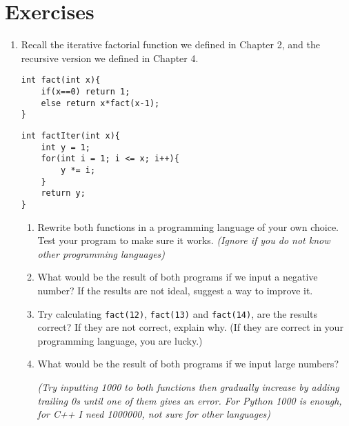 \section*{Exercises}

\begin{enumerate}[label=\textbf{\thechapter.\arabic*}]

\item Recall the iterative factorial function we defined in Chapter 2, and the recursive version we defined in Chapter 4. 

\begin{lstlisting}
int fact(int x){
    if(x==0) return 1;
    else return x*fact(x-1);
}
\end{lstlisting}

\begin{lstlisting}
int factIter(int x){
    int y = 1;
    for(int i = 1; i <= x; i++){
        y *= i;
    }
    return y;
}
\end{lstlisting}

\begin{enumerate}[leftmargin=0cm]

\item Rewrite both functions in a programming language of your own choice. Test your program to make sure it works. \textit{(Ignore if you do not know other programming languages)}
\item What would be the result of both programs if we input a negative number? If the results are not ideal, suggest a way to improve it.
\item Try calculating \texttt{fact(12)}, \texttt{fact(13)} and \texttt{fact(14)}, are the results correct? If they are not correct, explain why. (If they are correct in your programming language, you are lucky.)
\item What would be the result of both programs if we input large numbers? 

\textit{(Try inputting 1000 to both functions then gradually increase by adding trailing 0s until one of them gives an error. For Python 1000 is enough, for C++ I need 1000000, not sure for other languages)}
\end{enumerate}
\end{enumerate}